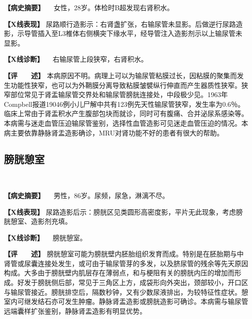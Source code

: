 \textbf{【病史摘要】} 　女性，28岁。体检时B超发现右肾积水。

\textbf{【X线表现】}
尿路顺行造影示：右肾盏扩张，右输尿管未显影。后做逆行尿路造影，示导管插入至L3椎体右侧横突下缘水平，经导管注入造影剂示以上输尿管未显影。

\textbf{【X线诊断】} 　右输尿管上段狭窄，右肾积水。

\textbf{【评　　述】}
本病原因不明。病理上可以为输尿管粘膜过长，因粘膜的聚集而发生功能性狭窄，也可以为外鞘膜分离导致粘膜皱襞纵行伸直而产生器质性狭窄。狭窄部位常见于肾盂输尿管交界处和输尿管膀胱连接处，中段极少见。1963年Compbell报道19046例小儿尸解中共有123例先天性输尿管狭窄，发生率为0.6％。临床上常由于肾盂积水产生腹部包块而就诊，同时可有腹痛、合并泌尿系感染等。本病需与迷走血管压迫输尿管鉴别，选择性血管造影可见迷走血管压迫的情况。本病主要依靠静脉肾盂造影确诊，MRU对肾功能不好的患者有很大的帮助。

\subsection{膀胱憩室}

\begin{figure}
    \centering
    \\
    \caption{}
    \label{fig6-2-12}
\end{figure}

\textbf{【病史摘要】} 　男性，86岁。尿频，尿急，淋漓不尽。

\textbf{【X线表现】}
尿路造影后示：膀胱区见类圆形高密度影，平片无此现象，考虑膀胱憩室、造影剂充填。

\textbf{【X线诊断】} 　膀胱憩室。

\textbf{【评　　述】}
膀胱憩室可能为膀胱壁内胚胎组织发育而成。特别是在胚胎期与中肾管或尿囊连接处发生，或可由于输尿管芽的多发，以及脐尿管的残余等先天原因构成。大多由于膀胱壁内肌层存在薄弱点，和与梗阻有关的膀胱内压的增加而形成。好发于膀胱侧后部，常见于三角区上方，成袋形向外突出，颈部较小，开口区与输尿管接近。膀胱排空后，隔数秒钟，又有少数尿液排出，为较特征性症状。憩室内可继发结石亦可发生肿瘤。静脉肾盂造影或膀胱造影可确诊。本病需与输尿管远端囊样扩张鉴别，静脉肾盂造影有明显优势。


